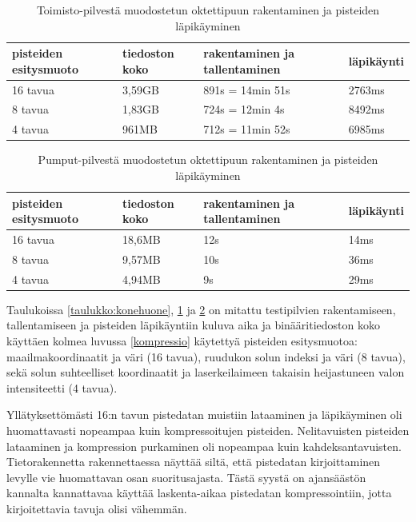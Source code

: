 \begin{table}[h]
    \begin{tabular}{|l|l|l|l|}
    \hline
    \textbf{pisteiden esitysmuoto} & \textbf{tiedoston koko} & \textbf{rakentaminen ja tallentaminen} & \textbf{läpikäynti} \\ \hline
    16 tavua & 3,59GB              & 891s = 14min 51s              & 2763ms     \\
    8 tavua  & 1,83GB              & 724s = 12min 4s               & 8492ms     \\
    4 tavua & 961MB               & 712s = 11min 52s              & 6985ms     \\ \hline
    \end{tabular}
    \caption{Toimisto-pilvestä muodostetun oktettipuun rakentaminen ja pisteiden läpikäyminen}
    \label{taulukko:toimisto}
\end{table}

\begin{table}[h]
    \begin{tabular}{|l|l|l|l|}
    \hline
    \textbf{pisteiden esitysmuoto} & \textbf{tiedoston koko} & \textbf{rakentaminen ja tallentaminen} & \textbf{läpikäynti} \\ \hline
    16 tavua       & 18,6MB              & 12s                           & 14ms       \\ \hline
    8 tavua      & 9,57MB              & 10s                           & 36ms       \\ \hline
    4 tavua      & 4,94MB              & 9s                            & 29ms       \\ \hline
    \end{tabular}
    \caption{Pumput-pilvestä muodostetun oktettipuun rakentaminen ja pisteiden läpikäyminen}
    \label{taulukko:pumput}
\end{table}

Taulukoissa \ref{taulukko:konehuone}, \ref{taulukko:toimisto} ja \ref{taulukko:pumput} on mitattu testipilvien rakentamiseen, tallentamiseen ja pisteiden läpikäyntiin kuluva aika ja binääritiedoston koko käyttäen kolmea luvussa \ref{kompressio} käytettyä pisteiden esitysmuotoa: maailmakoordinaatit ja väri (16 tavua), ruudukon solun indeksi ja väri (8 tavua), sekä solun suhteelliset koordinaatit ja laserkeilaimeen takaisin heijastuneen valon intensiteetti (4 tavua). 

Yllätyksettömästi 16:n tavun pistedatan muistiin lataaminen ja läpikäyminen oli huomattavasti nopeampaa kuin kompressoitujen pisteiden. Nelitavuisten pisteiden lataaminen ja kompression purkaminen oli nopeampaa kuin kahdeksantavuisten. Tietorakennetta rakennettaessa näyttää siltä, että pistedatan kirjoittaminen levylle vie huomattavan osan suoritusajasta. Tästä syystä on ajansäästön kannalta kannattavaa käyttää laskenta-aikaa pistedatan kompressointiin, jotta kirjoitettavia tavuja olisi vähemmän. 

